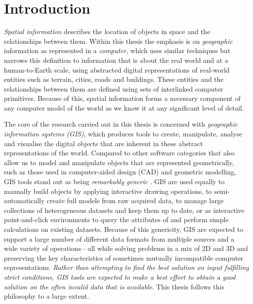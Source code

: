 
\chapter{Introduction}
\label{ch:introduction}


\emph{Spatial information} describes the location of objects in space and the relationships between them.
Within this thesis the emphasis is on \emph{geographic} information as represented in a \emph{computer}, which uses similar techniques but narrows this definition to information that is about the real world and at a human-to-Earth scale, using abstracted digital representations of real-world entities such as terrain, cities, roads and buildings.
These entities and the relationships between them are defined using sets of interlinked computer primitives.
Because of this, spatial information forms a necessary component of any computer model of the world as we know it at any significant level of detail.


The core of the research carried out in this thesis is concerned with \emph{geographic information systems (GIS)}, which produces tools to create, manipulate, analyse and visualise the digital objects that are inherent in these abstract representations of the world.
Compared to other software categories that also allow us to model and manipulate objects that are represented geometrically, such as those used in computer-aided design (CAD) and geometric modelling, GIS tools stand out as being \emph{remarkably generic} \citep{Coppock91,Gold06}.
GIS are used equally to manually build objects by applying interactive drawing operations, to semi-automatically create full models from raw acquired data, to manage large collections of heterogeneous datasets and keep them up to date, or as interactive point-and-click environments to query the attributes of and perform simple calculations on existing datasets.
Because of this genericity, GIS are expected to support a large number of different data formats from multiple sources and a wide variety of operations---all while solving problems in a mix of 2D and 3D and preserving the key characteristics of sometimes mutually incompatible computer representations.
\emph{Rather than attempting to find the best solution on input fulfilling strict conditions, GIS tools are expected to make a best effort to obtain a good solution on the often invalid data that is available}.
This thesis follows this philosophy to a large extent.

